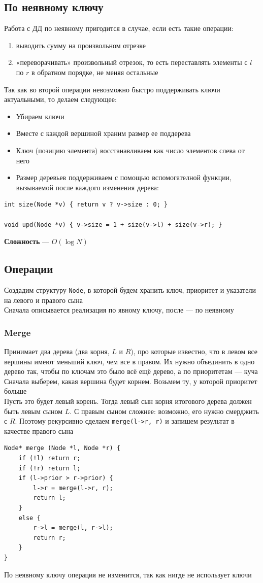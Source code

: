 \documentclass[a4paper]{article}
\newcommand{\code}[1]{\colorbox{codegray}{\texttt{#1}}}
\begin{document}
\subsection{По неявному ключу}
Работа с ДД по неявному пригодится в случае, если есть такие операции:
\begin{enumerate}
    \item выводить сумму на произвольном отрезке
    \item «переворачивать» произвольный отрезок, то есть переставлять элементы с $l$ по $r$ в обратном порядке, не меняя остальные
\end{enumerate}
Так как во второй операции невозможно быстро поддерживать ключи актуальными, то делаем следующее:
\begin{itemize}
    \item Убираем ключи
    \item Вместе с каждой вершиной храним размер ее поддерева
    \item Ключ (позицию элемента) восстанавливаем как число элементов слева от него
    \item Размер деревьев поддерживаем с помощью вспомогателной функции, вызываемой после каждого изменения дерева:
\end{itemize}
\begin{lstlisting}
int size(Node *v) { return v ? v->size : 0; }

void upd(Node *v) { v->size = 1 + size(v->l) + size(v->r); }
\end{lstlisting}
\textbf{Сложность} — $O(\log N)$
\subsection{Операции}
Создадим структуру \code{Node}, в которой будем хранить ключ, приоритет и указатели на левого и правого сына\\[2mm]
\indent Сначала описывается реализация по явному ключу, после — по неявному
\subsubsection{Merge}
Принимает два дерева (два корня, $L$ и $R$), про которые известно, что в левом все вершины имеют меньший ключ, чем все в правом. Их нужно объединить в одно дерево так, чтобы по ключам это было всё ещё дерево, а по приоритетам — куча\\[2mm]
\indent Сначала выберем, какая вершина будет корнем. Возьмем ту, у которой приоритет больше\\[2mm]
\indent Пусть это будет левый корень. Тогда левый сын корня итогового дерева должен быть левым сыном $L$. С правым сыном сложнее: возможно, его нужно смерджить с $R$. Поэтому рекурсивно сделаем \code{merge(l->r, r)} и запишем результат в качестве правого сына
\begin{lstlisting}
Node* merge (Node *l, Node *r) {
    if (!l) return r;
    if (!r) return l;
    if (l->prior > r->prior) {
        l->r = merge(l->r, r);
        return l;
    }
    else {
        r->l = merge(l, r->l);
        return r;
    }
}
\end{lstlisting}
По неявному ключу операция не изменится, так как нигде не использует ключи
\end{document}
